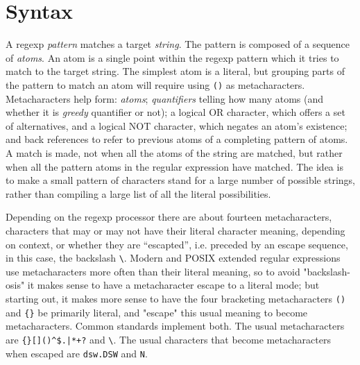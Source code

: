 \chapter{Syntax}
\label{chap:syntax}

A regexp \textsl{pattern} matches a target \textsl{string}. The
pattern is composed of a sequence of \textsl{atoms}. An atom is a
single point within the regexp pattern which it tries to match to the
target string. The simplest atom is a literal, but grouping parts of
the pattern to match an atom will require using \verb|()| as
metacharacters. Metacharacters help form: \textsl{atoms};
\textsl{quantifiers} telling how many atoms (and whether it is
\textsl{greedy} quantifier or not); a logical OR character, which
offers a set of alternatives, and a logical NOT character, which
negates an atom's existence; and back references to refer to previous
atoms of a completing pattern of atoms. A match is made, not when all
the atoms of the string are matched, but rather when all the pattern
atoms in the regular expression have matched. The idea is to make a
small pattern of characters stand for a large number of possible
strings, rather than compiling a large list of all the literal
possibilities.

Depending on the regexp processor there are about fourteen
metacharacters, characters that may or may not have their literal
character meaning, depending on context, or whether they are
``escapted'', i.e. preceded by an escape sequence, in this case, the
backslash \verb|\|. Modern and POSIX extended regular expressions use
metacharacters more often than their literal meaning, so to avoid
"backslash-osis" it makes sense to have a metacharacter escape to a
literal mode; but starting out, it makes more sense to have the four
bracketing metacharacters \verb|()| and \verb|{}| be primarily
literal, and "escape" this usual meaning to become
metacharacters. Common standards implement both. The usual
metacharacters are \verb/{}[]()^$.|*+?/ and \verb|\|. The usual
characters that become metacharacters when escaped are \verb|dsw.DSW|
and \verb|N|.

